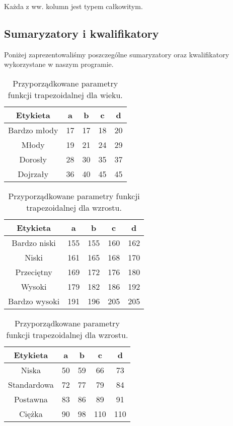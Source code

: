 \documentclass{classrep}
\begin{document}
Każda z ww. kolumn jest typem całkowitym.

\subsection{Sumaryzatory i kwalifikatory}
Poniżej zaprezentowaliśmy poszczególne sumaryzatory oraz kwalifikatory wykorzystane w naszym programie. 

\begin{table}[H]
	\centering
	\begin{tabular}{c c c c c} 
		\hline
		\textbf{Etykieta} & \textbf{a} & \textbf{b} & \textbf{c} &  \textbf{d} \\ [0.5ex] 
		\hline
		\hline 
		Bardzo młody & 17 & 17 & 18 & 20 \\ 
		Młody & 19 & 21 & 24 & 29 \\
		Dorosły & 28 & 30 & 35 & 37 \\
		Dojrzały & 36 & 40 & 45 & 45\\
		\hline
	\end{tabular}
	\caption{Przyporządkowane parametry funkcji trapezoidalnej dla wieku.}
\end{table}

\begin{table}[H]
	\centering
	\begin{tabular}{c c c c c} 
		\hline
		\textbf{Etykieta} & \textbf{a} & \textbf{b} & \textbf{c} &  \textbf{d} \\ [0.5ex] 
		\hline
		\hline 
		Bardzo niski & 155 & 155 & 160 & 162 \\ 
		Niski & 161 & 165 & 168 & 170 \\
		Przeciętny & 169 & 172 & 176 & 180 \\
		Wysoki & 179 & 182 & 186 & 192\\
		Bardzo wysoki & 191 & 196 & 205 & 205\\
		\hline
	\end{tabular}
	\caption{Przyporządkowane parametry funkcji trapezoidalnej dla wzrostu.}
\end{table}

\begin{table}[H]
	\centering
	\begin{tabular}{c c c c c} 
		\hline
		\textbf{Etykieta} & \textbf{a} & \textbf{b} & \textbf{c} &  \textbf{d} \\ [0.5ex] 
		\hline
		\hline 
		Niska & 50 & 59 & 66 & 73 \\ 
		Standardowa & 72 & 77 & 79 & 84 \\
		Postawna & 83 & 86 & 89 & 91 \\
		Ciężka & 90 & 98 & 110 & 110\\
		\hline
	\end{tabular}
	\caption{Przyporządkowane parametry funkcji trapezoidalnej dla wzrostu.}
\end{table}
\end{document}
